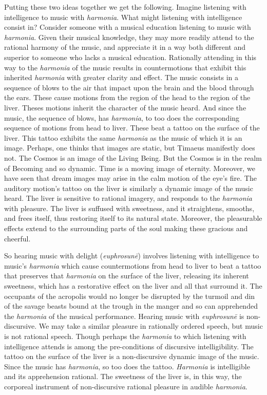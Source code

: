 Putting these two ideas together we get the following. Imagine listening with intelligence to music with \emph{harmonia}. What might listening with intelligence consist in? Consider someone with a musical education listening to music with \emph{harmonia}. Given their musical knowledge, they may more readily attend to the rational harmony of the music, and appreciate it in a way both different and superior to someone who lacks a musical education. Rationally attending in this way to the \emph{harmonia} of the music results in countermotions that exhibit this inherited \emph{harmonia} with greater clarity and effect. The music consists in a sequence of blows to the air that impact upon the brain and the blood through the ears. These cause motions from the region of the head to the region of the liver. Theses motions inherit the character of the music heard. And since the music, the sequence of blows, has \emph{harmonia}, to too does the corresponding sequence of motions from head to liver. These beat a tattoo on the surface of the liver. This tattoo exhibits the same \emph{harmonia} as the music of which it is an image. Perhaps, one thinks that images are static, but Timaeus manifestly does not. The Cosmos is an image of the Living Being. But the Cosmos is in the realm of Becoming and so dynamic. Time is a moving image of eternity. Moreover, we have seen that dream images may arise in the calm motion of the eye's fire. The auditory motion's tattoo on the liver is similarly a dynamic image of the music heard. The liver is sensitive to rational imagery, and responds to the \emph{harmonia} with pleasure. The liver is suffused with sweetness, and it straightens, smooths, and frees itself, thus restoring itself to its natural state. Moreover, the pleasurable effects extend to the surrounding parts of the soul making these gracious and cheerful.

So hearing music with delight (\emph{euphrosunē}) involves listening with intelligence to music's \emph{harmonia} which cause countermotions from head to liver to beat a tattoo that preserves that \emph{harmonia} on the surface of the liver, releasing its inherent sweetness, which has a restorative effect on the liver and all that surround it. The occupants of the acropolis would no longer be disrupted by the turmoil and din of the savage beasts bound at the trough in the manger and so can apprehended the \emph{harmonia} of the musical performance. Hearing music with \emph{euphrosunē} is non-discursive. We may take a similar pleasure in rationally ordered speech, but music is not rational speech. Though perhaps the \emph{harmonia} to which listening with intelligence attends is among the pre-conditions of discursive intelligibility. The tattoo on the surface of the liver is a non-discursive dynamic image of the music. Since the music has \emph{harmonia}, so too does the tattoo. \emph{Harmonia} is intelligible and its apprehension rational. The sweetness of the liver is, in this way, the corporeal instrument of non-discursive rational pleasure in audible \emph{harmonia}.

